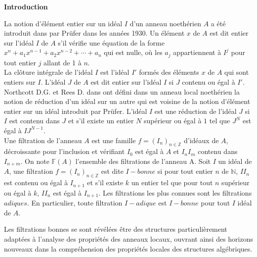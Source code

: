 \newpage
\tableofcontents
\renewcommand{\contentsname}{Table des matières}
\thispagestyle{empty}

\newpage

\setcounter{page}{0} 
\thispagestyle{empty}
\begin{center}
	\LARGE{\textbf{Introduction}}
\end{center}
\vspace{1cm}

La notion d'élément entier sur un idéal $I$ d'un anneau noethérien $A$ a été introduit dans \cite{Pr} par Prüfer dans les années 1930. Un élément $x$ de $A $ est dit entier sur l'idéal $I$ de $A$ s'il vérifie une équation de la forme $x^n + a_1 x^{n-1} +a_2 x^{n-2}+ \cdots + a_n $ qui est nulle, où les $a_j$ appartiennent à $I^j$ pour tout entier $j$ allant de 1 à $n$.\\ 
La clôture intégrale de l'idéal $I$ est l'idéal $I'$ formés des éléments $x$ de $A$ qui sont entiers sur $I$. L'idéal $J$ de $A$ est dit entier sur l'idéal $I$ si $J$ contenu ou égal à $I'$.\\ Northcott D.G. et Rees D. dans \cite{No} ont défini dans un anneau local noethérien la notion de réduction d'un idéal sur un autre qui est voisine de la notion d'élément entier sur un idéal introduit par Prüfer. L'idéal $I$ est une réduction de l'idéal $J$ si $I$ est contenu dans $J$ et s'il existe un entier $N$ supérieur ou égal à $1$ tel que $J^N$ est égal à $IJ^{N-1}$.\\
Une filtration de l'anneau $A$ est une famille $f=(I_n)_{n \in \mathbb{Z}}$ d'idéaux de $A$, décroissante pour l'inclusion et vérifiant $I_0$ est égal à $A$ et $I_n I_m$ contenu dans $I_{n+m}$. On note $\mathbb{F}(A)$ l'ensemble des filtrations de l'anneau A. Soit $I$ un idéal de $A$, une filtration $f=(I_n)_{n \in \mathbb{Z}}$ est dite $I-bonne$ si pour tout entier $n$ de $\mathbb{N}$, $II_n$ est contenu ou égal à $ I_{n+1}$ et s'il existe $k$ un entier tel que pour tout $n$ supérieur ou égal à $k$, $II_n$ est égal à $I_{n+1}$. Les filtrations les plus connues sont les filtrations $adiques$. En particulier, toute filtration $I-adique$ est $I-bonne$ pour tout $I$ idéal de $A$.

Les filtrations bonnes se sont révélées être des structures particulièrement adaptées à l'analyse des propriétés des anneaux locaux, ouvrant ainsi des horizons nouveaux dans la compréhension des propriétés locales des structures algébriques.

